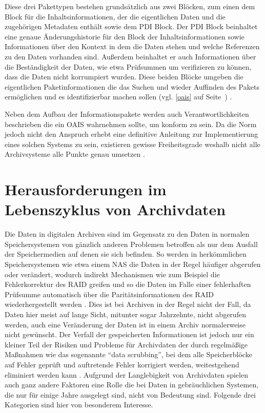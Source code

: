 \documentclass[conference,compsoc,final,a4paper]{IEEEtran}
\begin{document}
Diese drei Pakettypen bestehen grundsätzlich aus zwei Blöcken, zum einen dem Block für die Inhaltsinformationen, der die eigentlichen Daten und die zugehörigen Metadaten enthält sowie dem \ac{PDI} Block. Der \ac{PDI} Block beinhaltet eine genaue Änderungshistorie für den Block der Inhaltsinformationen sowie Informationen über den Kontext in dem die Daten stehen und welche Referenzen zu den Daten vorhanden sind. Außerdem beinhaltet er auch Informationen über die Beständigkeit der Daten, wie etwa Prüfsummen um verifizieren zu können, dass die Daten nicht korrumpiert wurden. Diese beiden Blöcke umgeben die eigentlichen Paketinformationen die das Suchen und wieder Auffinden des Pakets ermöglichen und es identifizierbar machen sollen (vgl. \autoref{oais} auf Seite~\pageref{oais}) \autocite{Ball2006}.

Neben dem Aufbau der Informationspakete werden auch Verantwortlichkeiten beschrieben die ein \ac{OAIS} wahrnehmen sollte, um konform zu sein. Da die Norm jedoch nicht den Anspruch erhebt eine definitive Anleitung zur Implementierung eines solchen Systems zu sein, existieren gewisse Freiheitsgrade weshalb nicht alle Archivsysteme alle Punkte genau umsetzen \autocite{Ball2006}.

\section{Herausforderungen im Lebenszyklus von Archivdaten}
Die Daten in digitalen Archiven sind im Gegensatz zu den Daten in normalen Speichersystemen von gänzlich anderen Problemen betroffen als nur dem Ausfall der Speichermedien auf denen sie sich befinden. So werden in herkömmlichen Speichersystemen wie etwa einem \ac{NAS} die Daten in der Regel häufiger abgerufen oder verändert, wodurch indirekt Mechanismen wie zum Beispiel die Fehlerkorrektur des \ac{RAID} greifen und so die Daten im Falle einer fehlerhaften Prüfsumme automatisch über die Paritätsinformationen des \ac{RAID} wiederhergestellt werden \autocite{Lakshmi2008}. Dies ist bei Archiven in der Regel nicht der Fall, da Daten hier meist auf lange Sicht, mitunter sogar Jahrzehnte, nicht abgerufen werden, auch eine Veränderung der Daten ist in einem Archiv normalerweise nicht gewünscht. Der Verfall der gespeicherten Informationen ist jedoch nur ein kleiner Teil der Risiken und Probleme für Archivdaten der durch regelmäßige Maßnahmen wie das sogenannte \enquote{data scrubbing}, bei dem alle Speicherblöcke auf Fehler geprüft und auftretende Fehler korrigiert werden, weitestgehend eliminiert werden kann \autocite{Lakshmi2008}. Aufgrund der Langlebigkeit von Archivdaten spielen auch ganz andere Faktoren eine Rolle die bei Daten in gebräuchlichen Systemen, die nur für einige Jahre ausgelegt sind, nicht von Bedeutung sind. Folgende drei Kategorien sind hier von besonderem Interesse.
\end{document}
